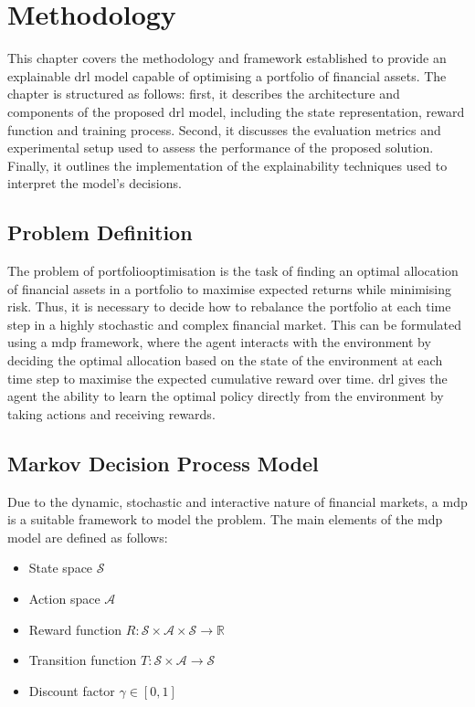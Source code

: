 \chapter{Methodology} \label{ch:methodology}

This chapter covers the methodology and framework established to provide an explainable \acrfull{drl} model capable of optimising a portfolio of financial assets. The chapter is structured as follows: first, it describes the architecture and components of the proposed \acrshort{drl} model, including the state representation, reward function and training process. Second, it discusses the evaluation metrics and experimental setup used to assess the performance of the proposed solution. Finally, it outlines the implementation of the explainability techniques used to interpret the model's decisions. 

\section{Problem Definition} \label{sec:problem-definition}

The problem of \gls{portfoliooptimisation} is the task of finding an optimal allocation of financial assets in a portfolio to maximise expected returns while minimising risk. Thus, it is necessary to decide how to rebalance the portfolio at each time step in a highly stochastic and complex financial market. This can be formulated using a \acrfull{mdp} framework, where the agent interacts with the environment by deciding the optimal allocation based on the state of the environment at each time step to maximise the expected cumulative reward over time. \acrfull{drl} gives the agent the ability to learn the optimal policy directly from the environment by taking actions and receiving rewards. 

\section{Markov Decision Process Model} \label{sec:mdp-model}

Due to the dynamic, stochastic and interactive nature of financial markets, a \acrlong{mdp} is a suitable framework to model the problem. The main elements of the \acrshort{mdp} model are defined as follows:
\begin{itemize}
    \item State space $\mathcal{S}$
    \item Action space $\mathcal{A}$
    \item Reward function $R: \mathcal{S} \times \mathcal{A} \times \mathcal{S} \to \mathbb{R}$
    \item Transition function $T: \mathcal{S} \times \mathcal{A} \to \mathcal{S}$
    \item Discount factor $\gamma \in [0,1]$
\end{itemize}


